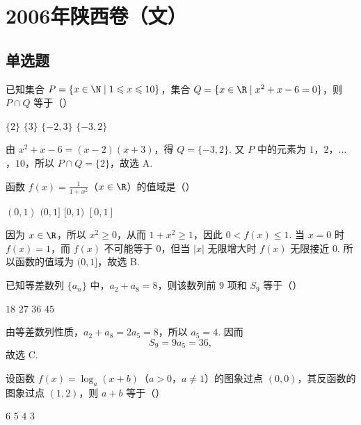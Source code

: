 \chapter{2006年陕西卷（文）}
\section{单选题}
\begin{problem}
已知集合 \(P = \{x \in \N \mid 1 \leqslant x \leqslant 10\}\)，集合 \(Q = \{x \in \R \mid x^2 + x - 6 = 0\}\)，则 \(P \cap Q\) 等于（\quad）

\choices
    {\(\{2\}\)}
    {\(\{3\}\)}
    {\(\{-2, 3\}\)}
    {\(\{-3, 2\}\)}
\end{problem}


\begin{solution}
由 \(x^{2}+x-6=(x-2)(x+3)\)，得 \(Q=\{-3,2\}\). 又 \(P\) 中的元素为 \(1\)，\(2\)，\(\ldots\)，\(10\)，所以 \(P\cap Q=\{2\}\)，故选 A.
\end{solution}

\begin{problem}
函数 \( f(x) = \frac{1}{1 + x^2} \)（\(x \in \R\)）的值域是（\quad）

\choices
    {\((0,1)\)}
    {\((0,1]\)}
    {\([0,1)\)}
    {\([0,1]\)}
\end{problem}


\begin{solution}
因为 \(x\in\R\)，所以 \(x^{2}\geqslant0\)，从而 \(1+x^{2}\geqslant1\)，因此 \(0<f(x)\leqslant1\). 当 \(x=0\) 时 \(f(x)=1\)，而 \(f(x)\) 不可能等于 \(0\)，但当 \(\lvert x\rvert\) 无限增大时 \(f(x)\) 无限接近 \(0\). 所以函数的值域为 \((0,1]\)，故选 B.
\end{solution}

\begin{problem}
已知等差数列 \(\{a_{n}\}\) 中，\(a_{2} + a_{8} = 8\)，则该数列前 \(9\) 项和 \(S_{9}\) 等于（\quad）

\choices
    {\(18\)}
    {\(27\)}
    {\(36\)}
    {\(45\)}
\end{problem}


\begin{solution}
由等差数列性质，\(a_{2}+a_{8}=2a_{5}=8\)，所以 \(a_{5}=4\). 因而
\[
S_{9}=9a_{5}=36,
\]
故选 C.
\end{solution}

\begin{problem}
设函数 \( f(x) = \log_a(x + b) \)（\(a > 0\)，\(a \neq 1\)）的图象过点 \((0,0)\)，其反函数的图象过点 \((1,2)\)，则 \( a + b \) 等于（\quad）

\choices
    {\(6\)}
    {\(5\)}
    {\(4\)}
    {\(3\)}
\end{problem}

